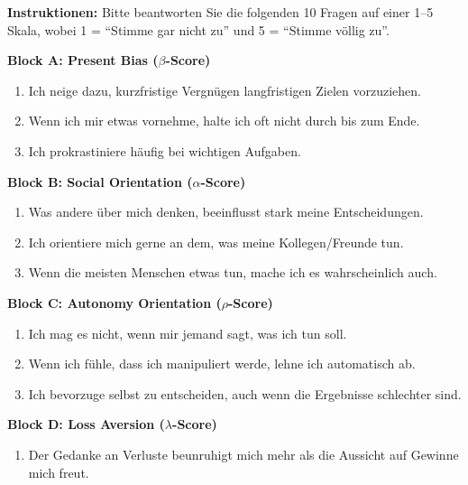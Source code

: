 \begin{tcolorbox}[colback=blue!5!white, colframe=blue!75!black, title=\textbf{Segment Screener: 10 Fragen, 2 Min Administrationszeit}]

\textbf{Instruktionen:} Bitte beantworten Sie die folgenden 10 Fragen auf einer 1--5 Skala, wobei 1 = ``Stimme gar nicht zu'' und 5 = ``Stimme völlig zu''.

\vspace{0.5cm}

\textbf{Block A: Present Bias ($\beta$-Score)}
\begin{enumerate}[label=\textbf{A\arabic*:}]
\item Ich neige dazu, kurzfristige Vergnügen langfristigen Zielen vorzuziehen.
\item Wenn ich mir etwas vornehme, halte ich oft nicht durch bis zum Ende.
\item Ich prokrastiniere häufig bei wichtigen Aufgaben.
\end{enumerate}

\textbf{Block B: Social Orientation ($\alpha$-Score)}
\begin{enumerate}[label=\textbf{B\arabic*:}]
\item Was andere über mich denken, beeinflusst stark meine Entscheidungen.
\item Ich orientiere mich gerne an dem, was meine Kollegen/Freunde tun.
\item Wenn die meisten Menschen etwas tun, mache ich es wahrscheinlich auch.
\end{enumerate}

\textbf{Block C: Autonomy Orientation ($\rho$-Score)}
\begin{enumerate}[label=\textbf{C\arabic*:}]
\item Ich mag es nicht, wenn mir jemand sagt, was ich tun soll.
\item Wenn ich fühle, dass ich manipuliert werde, lehne ich automatisch ab.
\item Ich bevorzuge selbst zu entscheiden, auch wenn die Ergebnisse schlechter sind.
\end{enumerate}

\textbf{Block D: Loss Aversion ($\lambda$-Score)}
\begin{enumerate}[label=\textbf{D\arabic*:}]
\item Der Gedanke an Verluste beunruhigt mich mehr als die Aussicht auf Gewinne mich freut.
\end{enumerate}

\vspace{0.5cm}


\end{tcolorbox}
